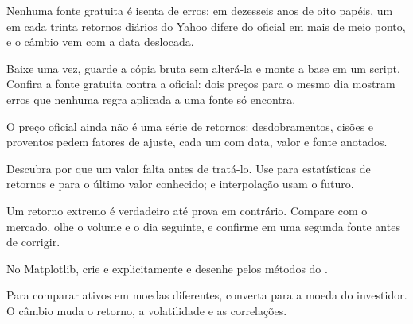 \begin{resumo}
  \item Nenhuma fonte gratuita é isenta de erros: em dezesseis anos de oito papéis, um em cada trinta retornos diários do Yahoo difere do oficial em mais de meio ponto, e o câmbio vem com a data deslocada.
  \item Baixe uma vez, guarde a cópia bruta sem alterá-la e monte a base em um script. Confira a fonte gratuita contra a oficial: dois preços para o mesmo dia mostram erros que nenhuma regra aplicada a uma fonte só encontra.
  \item O preço oficial ainda não é uma série de retornos: desdobramentos, cisões e proventos pedem fatores de ajuste, cada um com data, valor e fonte anotados.
  \item Descubra por que um valor falta antes de tratá-lo. Use  para estatísticas de retornos e  para o último valor conhecido;  e interpolação usam o futuro.
  \item Um retorno extremo é verdadeiro até prova em contrário. Compare com o mercado, olhe o volume e o dia seguinte, e confirme em uma segunda fonte antes de corrigir.
  \item No Matplotlib, crie  e  explicitamente e desenhe pelos métodos do .
  \item Para comparar ativos em moedas diferentes, converta para a moeda do investidor. O câmbio muda o retorno, a volatilidade e as correlações.
\end{resumo}

